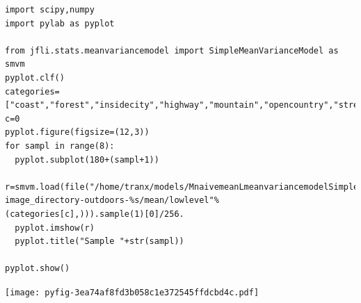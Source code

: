 \documentclass{report}
\begin{document}
\begin{lstlisting}
import scipy,numpy
import pylab as pyplot

from jfli.stats.meanvariancemodel import SimpleMeanVarianceModel as smvm
pyplot.clf()
categories=["coast","forest","insidecity","highway","mountain","opencountry","street","tallbuilding"]
c=0
pyplot.figure(figsize=(12,3))
for sampl in range(8):
  pyplot.subplot(180+(sampl+1))
  r=smvm.load(file("/home/tranx/models/MnaivemeanLmeanvariancemodelSimpleMeanVarianceModel-image_directory-outdoors-%s/mean/lowlevel"%(categories[c],))).sample(1)[0]/256.
  pyplot.imshow(r)
  pyplot.title("Sample "+str(sampl))

pyplot.show()

\end{lstlisting}















\noindent
\texttt{[image: pyfig-3ea74af8fd3b058c1e372545ffdcbd4c.pdf]}
\end{document}
